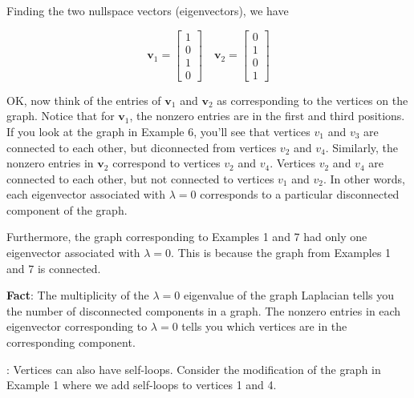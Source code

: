 \documentclass[12pt]{article}
\newcommand{\nin}{\noindent}
\newcommand{\vthree}{\vspace{3mm}}
\newcommand{\mymat}[1]{
\left[
\begin{array}{rrrrrrrrrrrrrrrrrrrrrrrrrrrrrrrrrrrrrrr}
#1
\end{array}
\right]
}
\newcommand{\bv}{\mathbf{v}}
\begin{document}
\clearpage

\nin Finding the two nullspace vectors (eigenvectors), we have

\[
\bv_1 = \mymat{1 \\ 0 \\ 1 \\ 0}
\quad
\bv_2 = \mymat{0 \\ 1 \\ 0 \\ 1}
\]

\vthree

\nin OK, now think of the entries of $\bv_1$ and $\bv_2$ as corresponding to the vertices on the graph.  Notice that for $\bv_1$, the nonzero entries are in the first and third positions.  If you look at the graph in Example 6, you'll see that vertices $v_1$ and $v_3$ are connected to each other, but diconnected from vertices $v_2$ and $v_4$.  Similarly, the nonzero entries in $\bv_2$ correspond to vertices $v_2$ and $v_4$.  Vertices $v_2$ and $v_4$ are connected to each other, but not connected to vertices $v_1$ and $v_2$.    In other words, each eigenvector associated with $\lambda=0$ corresponds to a particular disconnected component of the graph.

\vthree

\nin Furthermore, the graph corresponding to Examples 1 and 7 had only one eigenvector associated with $\lambda = 0$.  This is because the graph from Examples 1 and 7 is connected.

\vthree

{\bf Fact}:  The multiplicity of the $\lambda = 0$ eigenvalue of the graph Laplacian tells you the number of disconnected components in a graph.  The nonzero entries in each eigenvector corresponding to $\lambda = 0$ tells you which vertices are in the corresponding  component.


\clearpage

\nin {\bf Example 7}:  Vertices can also have self-loops.  Consider the modification of the graph in Example 1 where we add self-loops to vertices 1 and 4.

\vthree

\begin{center}
\end{center}
\end{document}
